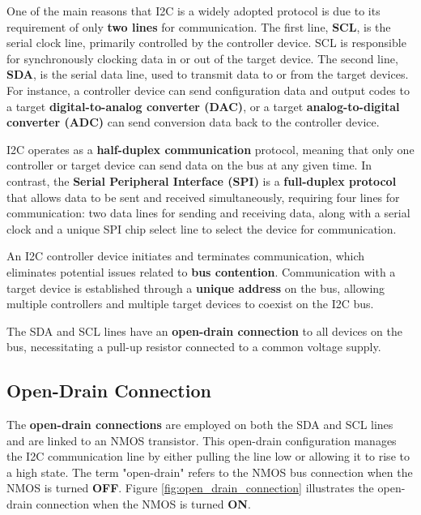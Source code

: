 \documentclass[a4paper,12pt]{report}
\begin{document}
One of the main reasons that I2C is a widely adopted protocol is due to its requirement of only \textbf{two lines} for communication. The first line, \textbf{SCL}, is the serial clock line, primarily controlled by the controller device. SCL is responsible for synchronously clocking data in or out of the target device. The second line, \textbf{SDA}, is the serial data line, used to transmit data to or from the target devices. For instance, a controller device can send configuration data and output codes to a target \textbf{digital-to-analog converter (DAC)}, or a target \textbf{analog-to-digital converter (ADC)} can send conversion data back to the controller device.

\vspace*{0.25in}

I2C operates as a \textbf{half-duplex communication} protocol, meaning that only one controller or target device can send data on the bus at any given time. In contrast, the \textbf{Serial Peripheral Interface (SPI)} is a \textbf{full-duplex protocol} that allows data to be sent and received simultaneously, requiring four lines for communication: two data lines for sending and receiving data, along with a serial clock and a unique SPI chip select line to select the device for communication.

\vspace{0.25in}

An I2C controller device initiates and terminates communication, which eliminates potential issues related to \textbf{bus contention}. Communication with a target device is established through a \textbf{unique address} on the bus, allowing multiple controllers and multiple target devices to coexist on the I2C bus.

\vspace{0.25in}

The SDA and SCL lines have an \textbf{open-drain connection} to all devices on the bus, necessitating a pull-up resistor connected to a common voltage supply.

\subsection{Open-Drain Connection}

The \textbf{open-drain connections} are employed on both the SDA and SCL lines and are linked to an NMOS transistor. This open-drain configuration manages the I2C communication line by either pulling the line low or allowing it to rise to a high state. The term "open-drain" refers to the NMOS bus connection when the NMOS is turned \textbf{OFF}. Figure \ref{fig:open_drain_connection} illustrates the open-drain connection when the NMOS is turned \textbf{ON}.
\end{document}

